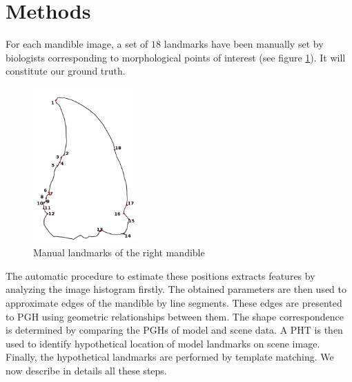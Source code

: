 \documentclass[twoside,twocolumn,10pt]{article}
\begin{document}
\section{Methods}
For each mandible image, a set of $18$ landmarks have been 
manually set by biologists corresponding to morphological points of
interest (see figure \ref{fig:segmentation}). It will constitute our ground truth. 
\begin{figure}
\includegraphics[width=4cm]{./images/rshape1}
\caption{\small{Manual landmarks of the right mandible}\label{fig:segmentation}}
\end{figure}
The automatic procedure to estimate these positions extracts
features by analyzing the image histogram firstly. The obtained
parameters are then used to approximate edges of the
mandible by line segments. These edges are presented to PGH
using geometric relationships between them. The shape correspondence
is determined by comparing the PGHs of model and scene data. A PHT 
is then used to identify hypothetical location of model landmarks on scene
image. Finally, the hypothetical landmarks are performed by template
matching. We now describe in details all these steps.
\end{document}
